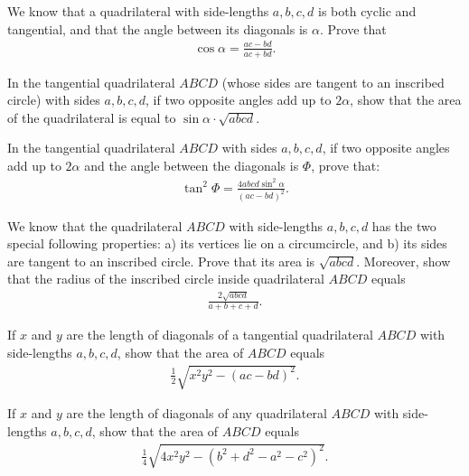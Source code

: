 \begin{question}
    We know that a quadrilateral with side-lengths $a,b,c,d$ is both cyclic and tangential, and that the angle between its diagonals is $\alpha$. Prove that
    \begin{align*}
        \cos \alpha = \frac{ac-bd}{ac+bd}.
    \end{align*}
\end{question}


\begin{question}
    In the tangential quadrilateral $ABCD$ (whose sides are tangent to an inscribed circle) with sides $a,b,c,d$, if two opposite angles add up to $2\alpha$, show that the area of the quadrilateral is equal to $\sin \alpha \cdot\sqrt{abcd}$.
\end{question}


\begin{question}
    In the tangential quadrilateral $ABCD$ with sides $a,b,c,d$, if two opposite angles add up to $2\alpha$ and the angle between the diagonals is $\Phi$, prove that:
    \begin{align*}
        \tan^2 \Phi = \frac{4abcd\sin^2 \alpha}{(ac-bd)^2}.
    \end{align*}
\end{question}

\begin{question}
    We know that the quadrilateral $ABCD$ with side-lengths $a,b,c,d$ has the two special following properties: a) its vertices lie on a circumcircle, and b) its sides are tangent to an inscribed circle. Prove that its area is $\sqrt{abcd}$. Moreover, show that the radius of the inscribed circle inside quadrilateral $ABCD$ equals
    \begin{align*}
        \frac{2\sqrt{abcd}}{a+b+c+d}.
    \end{align*}
\end{question}


\begin{question}
    If $x$ and $y$ are the length of diagonals of a tangential quadrilateral $ABCD$ with side-lengths $a,b,c,d$, show that the area of $ABCD$ equals
    \begin{align*}
        \frac{1}{2}\sqrt{x^2y^2 - (ac-bd)^2}.
    \end{align*}
\end{question}


\begin{question}
    If $x$ and $y$ are the length of diagonals of any quadrilateral $ABCD$ with side-lengths $a,b,c,d$, show that the area of $ABCD$ equals
    \begin{align*}
        \frac{1}{4}\sqrt{4x^2y^2 - (b^2+d^2-a^2-c^2)^2}.
    \end{align*}
\end{question}



